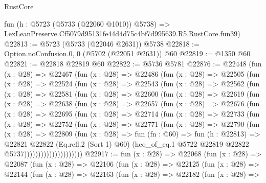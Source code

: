 \begin{lexlean}{RustCore}
\begin{coremodule}
    fun (h : @5723 (@5733 (@22060 @1010)) @5738) =>
    LexLeanPreserve.Cf5079d95131fe44d4d75c4bf7d995639.R5.RustCore.fun39)
@22813 := @5723 (@5733 (@22046 @2631)) @5738
@22818 := Option.noConfusion.{0, 0} (@5702 (@22051 @2631)) @60
@22819 := @1350 @60
@22821 := @22818 @22819 @60
@22822 := @5736 @5781
@22876 := @22448
    (fun (x : @28) =>
    @22467
      (fun (x : @28) =>
      @22486
        (fun (x : @28) =>
        @22505
          (fun (x : @28) =>
          @22524
            (fun (x : @28) =>
            @22543
              (fun (x : @28) =>
              @22562
                (fun (x : @28) =>
                @22581
                  (fun (x : @28) =>
                  @22600
                    (fun (x : @28) =>
                    @22619
                      (fun (x : @28) =>
                      @22638
                        (fun (x : @28) =>
                        @22657
                          (fun (x : @28) =>
                          @22676
                            (fun (x : @28) =>
                            @22695
                              (fun (x : @28) =>
                              @22714
                                (fun (x : @28) =>
                                @22733
                                  (fun (x : @28) =>
                                  @22752
                                    (fun (x : @28) =>
                                    @22771
                                      (fun (x : @28) =>
                                      @22790
                                        (fun (x : @28) =>
                                        @22809
                                          (fun (x : @28) =>
                                          fun (fn : @60) =>
                                          fun (h : @22813) =>
                                          @22821
                                            @22822
                                            (Eq.refl.{2} (Sort 1) @60)
                                            (heq_of_eq.{1}
                                              @5722
                                              @22819
                                              @22822
                                              @5737)))))))))))))))))))))
@22917 := fun (x : @28) =>
  @22068
    (fun (x : @28) =>
    @22087
      (fun (x : @28) =>
      @22106
        (fun (x : @28) =>
        @22125
          (fun (x : @28) =>
          @22144
            (fun (x : @28) =>
            @22163
              (fun (x : @28) =>
              @22182
                (fun (x : @28) =>

\end{coremodule}
\end{lexlean}
